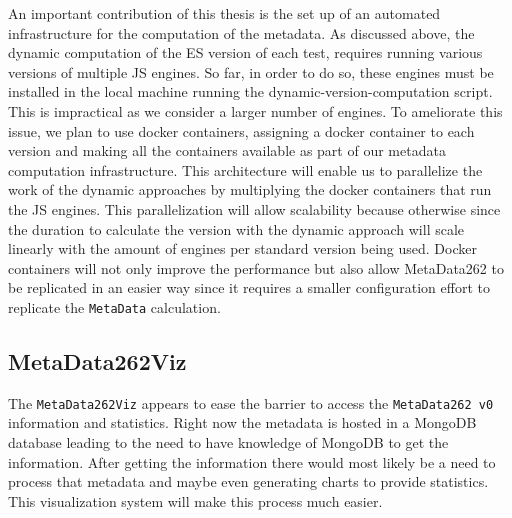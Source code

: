 \documentclass[runningheads]{llncs}
\begin{document}
An important contribution of this thesis is the set up of an automated infrastructure for the computation of the metadata. As discussed above, the dynamic computation of the ES version of each test, requires running various versions of multiple JS engines. So far, in order to do so, these engines must be installed in the local machine running the dynamic-version-computation script. This is impractical as we consider a larger number of engines. To ameliorate this issue, we plan to use docker containers, assigning a docker container to each version and making all the containers available as part of our metadata computation infrastructure. This architecture will enable us to parallelize the work of the dynamic approaches by multiplying the docker containers that run the JS engines. This parallelization will allow scalability because otherwise since the duration to calculate the version with the dynamic approach will scale linearly with the amount of engines per standard version being used. Docker containers will not only improve the performance but also allow MetaData262 to be replicated in an easier way since it requires a smaller configuration effort to replicate the \texttt{MetaData} calculation.


\subsection{MetaData262Viz}
\label{sub:metadata262_visualization_system}


The \texttt{MetaData262Viz} appears to ease the barrier to access the \texttt{MetaData262 v0} information and statistics. Right now the metadata is hosted in a MongoDB database leading to the need to have knowledge of MongoDB to get the information. After getting the information there would most likely be a need to process that metadata and maybe even generating charts to provide statistics. This visualization system will make this process much easier.
\end{document}

